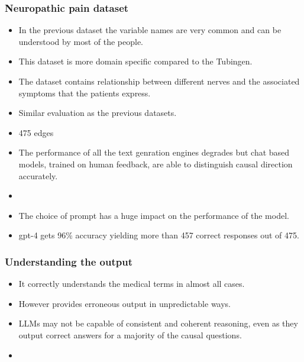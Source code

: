 \documentclass{beamer}
\begin{document}
\begin{frame}
	\frametitle{Neuropathic pain dataset}
	\begin{itemize}
		\item In the previous dataset the variable names are very common and
			can be understood by most of the people.
		\item This dataset is more domain specific compared to the Tubingen.
		\item The dataset contains relationship between different nerves and 
			the associated symptoms that the patients express.
		\item Similar evaluation as the previous datasets.
		\item 475 edges
		\item The performance of all the text genration engines degrades but
			chat based models, trained on human feedback, are able to 
			distinguish causal direction accurately.
		\item {}
		\item The choice of prompt has a huge impact on the performance of the
			model.
		\item gpt-4 gets 96\% accuracy yielding more than 457 correct responses
			out of 475.
	\end{itemize}
\end{frame}

\begin{frame}
	\frametitle{Understanding the output}
	\begin{itemize}
		\item It correctly understands the medical terms in almost all cases.
		\item However provides erroneous output in unpredictable ways.
		\item LLMs may not be capable of consistent and coherent reasoning, even
			as they output correct answers for a majority of the causal 
			questions.
		\item {}
	\end{itemize}
\end{frame}
\end{document}
